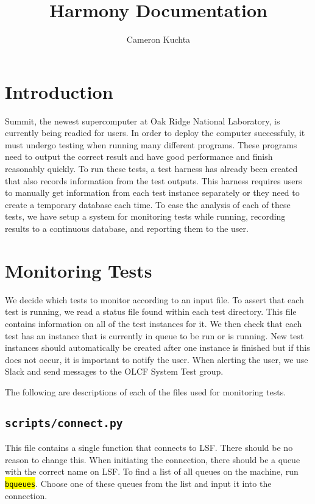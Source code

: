 \documentclass{article}
\title{Harmony Documentation}
\author{Cameron Kuchta}
\newcommand{\code}[1]{\textcolor{red}{\hl{\texttt{#1}}}}
\begin{document}

\maketitle

\section{Introduction}

Summit, the newest supercomputer at Oak Ridge National Laboratory, is currently being readied for users. In order to deploy the computer successfuly, it must undergo testing when running many different programs. These programs need to output the correct result and have good performance and finish reasonably quickly. To run these tests, a test harness has already been created that also records information from the test outputs. This harness requires users to manually get information from each test instance separately or they need to create a temporary database each time. To ease the analysis of each of these tests, we have setup a system for monitoring tests while running, recording results to a continuous database, and reporting them to the user.

\section{Monitoring Tests}

We decide which tests to monitor according to an input file. To assert that each test is running, we read a status file found within each test directory. This file contains information on all of the test instances for it. We then check that each test has an instance that is currently in queue to be run or is running. New test instances should automatically be created after one instance is finished but if this does not occur, it is important to notify the user. When alerting the user, we use Slack and send messages to the OLCF System Test group.

The following are descriptions of each of the files used for monitoring tests.

\subsection{\texttt{scripts/connect.py}}

This file contains a single function that connects to LSF. There should be no reason to change this. When initiating the connection, there should be a queue with the correct name on LSF. To find a list of all queues on the machine, run \code{bqueues}. Choose one of these queues from the list and input it into the connection.
\end{document}
